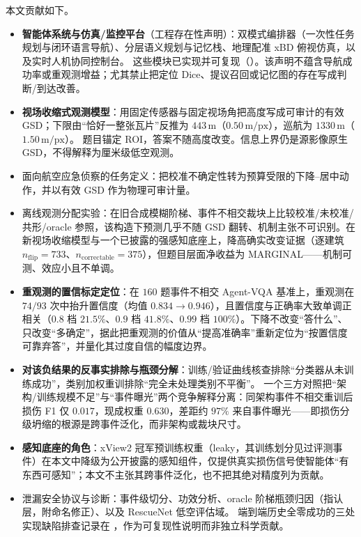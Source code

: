 本文贡献如下。
\begin{itemize}
\item \textbf{智能体系统与仿真/监控平台}（工程存在性声明）：双模式编排器（一次性任务规划与闭环语言导航）、分层语义规划与记忆栈、地理配准 xBD 俯视仿真，以及实时人机协同控制台。
这些模块已实现并可复现（）。该声明不蕴含导航成功率或重观测增益；尤其禁止把定位 Dice、提议召回或记忆图的存在写成判断/到达改善。
\item \textbf{视场收缩式观测模型}：用固定传感器与固定视场角把高度写成可审计的有效 GSD；下限由``恰好一整张瓦片''反推为 $443\,\mathrm{m}$（$0.50\,\mathrm{m/px}$），巡航为 $1330\,\mathrm{m}$（$1.50\,\mathrm{m/px}$）。
题目锚定 ROI，答案不随高度改变。信息上界仍是源影像原生 GSD，不得解释为厘米级低空观测。
\item 面向航空应急侦察的任务定义：把校准不确定性转为预算受限的下降--居中动作，并以有效 GSD 作为物理可审计量。
\item 离线观测分配实验：在旧合成模糊阶梯、事件不相交裁块上比较校准/未校准/共形/oracle 参照，该构造下预测几乎不随 GSD 翻转、机制主张不可识别。在新视场收缩模型与一个已披露的强感知底座上，降高确实改变证据（逐建筑 $n_{\mathrm{flip}}=733$、$n_{\mathrm{correctable}}=375$），但题目层面净收益为 MARGINAL——机制可测、效应小且不单调。
\item \textbf{重观测的置信标定定位}：在 $160$ 题事件不相交 Agent-VQA 基准上，重观测在 $74/93$ 次中抬升置信度（均值 $0.834\to0.946$），且置信度与正确率大致单调正相关（$0.8$ 档 $21.5\%$、$0.9$ 档 $41.8\%$、$0.99$ 档 $100\%$）。下降不改变``答什么''、只改变``多确定''，据此把重观测的价值从``提高准确率''重新定位为``按置信度可靠弃答''，并量化其过度自信的幅度边界。
\item \textbf{对该负结果的反事实排除与瓶颈分解}：训练/验证曲线核查排除``分类器从未训练成功''，类别加权重训排除``完全未处理类别不平衡''。
一个三方对照把``架构/训练规模不足''与``事件曝光''两个竞争解释分离：同架构事件不相交重训后损伤 F1 仅 $0.017$，现成权重 $0.630$，差距约 $97\%$ 来自事件曝光——即损伤分级坍缩的根源是跨事件泛化，而非架构或裁块尺寸。
\item \textbf{感知底座的角色}：xView2 冠军预训练权重（leaky，其训练划分见过评测事件）在本文中降级为公开披露的感知组件，仅提供真实损伤信号使智能体``有东西可感知''；本文不主张其跨事件泛化，也不把其绝对精度列为贡献。
\item 泄漏安全协议与诊断：事件级切分、功效分析、oracle 阶梯瓶颈归因（指认层，附命名修正）、以及 RescueNet 低空评估域。
端到端历史全零成功的三处实现缺陷排查记录在 ，作为可复现性说明而非独立科学贡献。
\end{itemize}
